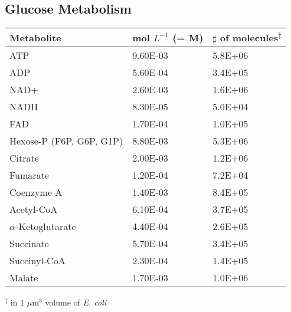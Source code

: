 \documentclass{article}
\begin{document}
        \subsection{Glucose Metabolism}
            \begin{tabular}{ |l|l|l| } %
                \hline
                Metabolite & mol $L^{-1}$ (= M) & $\sharp$ of molecules\textsuperscript{$\dagger$} \\ 
                \hline
                ATP & \num{9.60E-03}  &  \num{5.8E+06}    \\
                ADP & \num{5.60E-04}  &  \num{3.4E+05}    \\
                NAD+    & \num{2.60E-03}  &     \num{1.6E+06}   \\
                NADH    & \num{8.30E-05}  &     \num{5.0E+04}   \\
                FAD & \num{1.70E-04}  &  \num{1.0E+05}    \\
                Hexose-P (F6P, G6P, G1P)    & \num{8.80E-03}  &     \num{5.3E+06}   \\
                Citrate & \num{2.00E-03}  &  \num{1.2E+06}    \\
                Fumarate    & \num{1.20E-04}  &     \num{7.2E+04}   \\
                Coenzyme A  & \num{1.40E-03}  &   \num{8.4E+05} \\
                Acetyl-CoA  & \num{6.10E-04}  &   \num{3.7E+05} \\
                $\alpha$-Ketoglutarate & \num{4.40E-04}  &  \num{2.6E+05}    \\
                Succinate   & \num{5.70E-04}  &    \num{3.4E+05}  \\
                Succinyl-CoA    & \num{2.30E-04}  &     \num{1.4E+05}   \\
                Malate  & \num{1.70E-03}  &   \num{1.0E+06} \\
                \hline
            \end{tabular}
            
            \textsuperscript{$\dagger$} in 1 $\mu$m$^{3}$ volume of \textit{E. coli}
\end{document}
